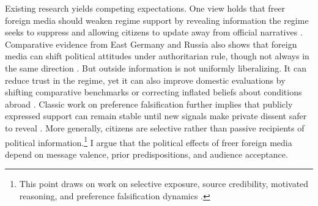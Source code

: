 \documentclass[12pt,american]{article}
\begin{document}
Existing research yields competing expectations. One view holds that freer foreign media should weaken regime support by revealing information the regime seeks to suppress and allowing citizens to update away from official narratives \citep{BesleyPrat2006,EgorovGurievSonin2009,gurievtreisman2019,chenyang2019}. Comparative evidence from East Germany and Russia also shows that foreign media can shift political attitudes under authoritarian rule, though not always in the same direction \citep{KernHainmueller2009,EnikolopovPetrovaZhuravskaya2011}. But outside information is not uniformly liberalizing. It can reduce trust in the regime, yet it can also improve domestic evaluations by shifting comparative benchmarks or correcting inflated beliefs about conditions abroad \citep{bursztynyang2022,DuchStevenson2008,hobbsroberts2018,huang2015international,huangyeh2017,KayserPeress2012}. Classic work on preference falsification further implies that publicly expressed support can remain stable until new signals make private dissent safer to reveal \citep{Kuran1991,Kuran1995}. More generally, citizens are selective rather than passive recipients of political information.\footnote{This point draws on work on selective exposure, source credibility, motivated reasoning, and preference falsification dynamics \citep{BakshyMessingAdamic2015,Druckman2001,GentzkowShapiro2006,Kuran1995,Levendusky2013,LupiaMcCubbins1998CUP,Prior2007CUP,taberlodge2006,wangwestwood2024,zaller1992}.} I argue that the political effects of freer foreign media depend on message valence, prior predispositions, and audience acceptance.
\end{document}
